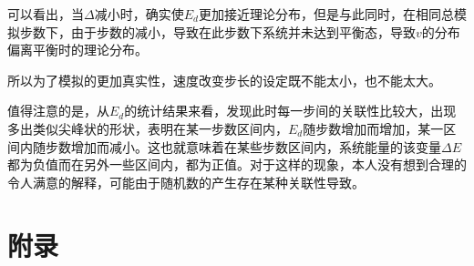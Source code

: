 \documentclass[a4paper,11pt]{article}
\begin{document}
可以看出，当$\Delta$减小时，确实使$E_{d}$更加接近理论分布，但是与此同时，在相同总模拟步数下，由于步数的减小，导致在此步数下系统并未达到平衡态，导致$v$的分布偏离平衡时的理论分布。

所以为了模拟的更加真实性，速度改变步长的设定既不能太小，也不能太大。

值得注意的是，从$E_{d}$的统计结果来看，发现此时每一步间的关联性比较大，出现多出类似尖峰状的形状，表明在某一步数区间内，$E_{d}$随步数增加而增加，某一区间内随步数增加而减小。这也就意味着在某些步数区间内，系统能量的该变量$\Delta E$都为负值而在另外一些区间内，都为正值。对于这样的现象，本人没有想到合理的令人满意的解释，可能由于随机数的产生存在某种关联性导致。
 

\newpage
\section{附录}
\end{document}

